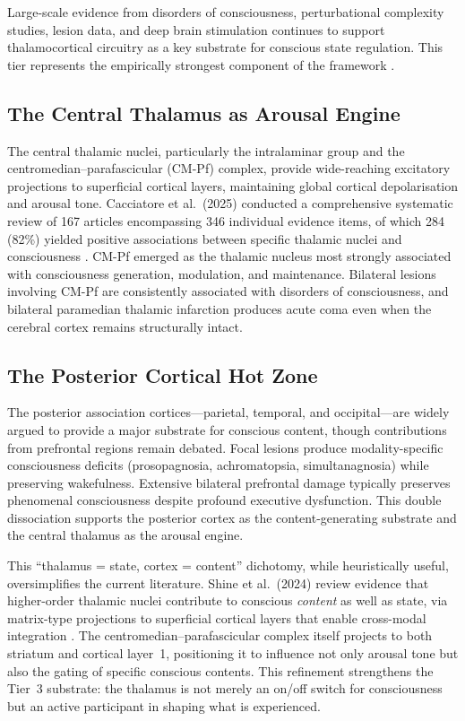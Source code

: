 \documentclass[10pt, a4paper, twocolumn]{article}
\begin{document}
Large-scale evidence from disorders of consciousness, perturbational
complexity studies, lesion data, and deep brain stimulation continues to
support thalamocortical circuitry as a key substrate for conscious state
regulation. This tier represents the empirically strongest component of
the framework \cite{cacciatore2025}.

\subsection{The Central Thalamus as Arousal Engine}

The central thalamic nuclei, particularly the intralaminar group and the
centromedian--parafascicular (CM-Pf) complex, provide wide-reaching
excitatory projections to superficial cortical layers, maintaining
global cortical depolarisation and arousal tone. Cacciatore et al.\
(2025) conducted a comprehensive systematic review of 167 articles
encompassing 346 individual evidence items, of which 284 (82\%) yielded
positive associations between specific thalamic nuclei and
consciousness \cite{cacciatore2025}. CM-Pf emerged as the thalamic
nucleus most strongly associated with consciousness generation,
modulation, and maintenance. Bilateral lesions involving CM-Pf are
consistently associated with disorders of consciousness, and bilateral
paramedian thalamic infarction produces acute coma even when the
cerebral cortex remains structurally intact.

\subsection{The Posterior Cortical Hot Zone}

The posterior association cortices---parietal, temporal, and
occipital---are widely argued to provide a major substrate for conscious
content, though contributions from prefrontal regions remain debated.
Focal lesions produce modality-specific consciousness deficits
(prosopagnosia, achromatopsia, simultanagnosia) while preserving
wakefulness. Extensive bilateral prefrontal damage typically preserves
phenomenal consciousness despite profound executive dysfunction. This
double dissociation supports the posterior cortex as the
content-generating substrate and the central thalamus as the arousal
engine.

This ``thalamus = state, cortex = content'' dichotomy, while
heuristically useful, oversimplifies the current literature.
Shine et al.\ (2024) review evidence that higher-order thalamic
nuclei contribute to conscious \emph{content} as well as state,
via matrix-type projections to superficial cortical layers that
enable cross-modal integration \cite{shine2024neuron}. The
centromedian--parafascicular complex itself projects to both
striatum and cortical layer~1, positioning it to influence not
only arousal tone but also the gating of specific conscious
contents. This refinement strengthens the Tier~3 substrate:
the thalamus is not merely an on/off switch for consciousness
but an active participant in shaping what is experienced.
\end{document}
